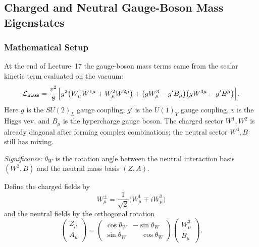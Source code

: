 \subsection{Charged and Neutral Gauge-Boson Mass Eigenstates}\label{subsec:lec18:gauge-mass-eigenstates}

\subsubsection*{Mathematical Setup}

At the end of Lecture~17 the gauge-boson mass terms came from the scalar
kinetic term evaluated on the vacuum:
\begin{equation}
  \mathcal{L}_{\rm mass}
  =\frac{v^2}{8}\Big[g^2\big(W^1_\mu W^{1\mu}+W^2_\mu W^{2\mu}\big)
  +\big(gW^3_\mu-g'B_\mu\big)\big(gW^{3\mu}-g'B^\mu\big)\Big] .
  \label{eq:lec18:starting-mass-terms}
\end{equation}
Here $g$ is the $SU(2)_L$ gauge coupling, $g'$ is the $U(1)_Y$ gauge coupling,
$v$ is the Higgs vev, and $B_\mu$ is the hypercharge gauge boson. The charged
sector $W^1,W^2$ is already diagonal after forming complex combinations; the
neutral sector $W^3,B$ still has mixing.


\textit{Significance:} $\theta_W$ is the rotation angle between the neutral interaction basis $(W^3,B)$ and the neutral mass basis $(Z,A)$.

Define the charged fields by
\begin{equation}
  \boxed{\;W^\pm_\mu=\frac{1}{\sqrt2}\big(W^1_\mu\mp iW^2_\mu\big)\;}
  \label{eq:lec18:wpm-definition}
\end{equation}
and the neutral fields by the orthogonal rotation
\begin{equation}
  \boxed{\;
  \begin{pmatrix} Z_\mu \\ A_\mu \end{pmatrix}
  =
  \begin{pmatrix}
    \cos\theta_W & -\sin\theta_W \\
    \sin\theta_W & \phantom{-}\cos\theta_W
  \end{pmatrix}
  \begin{pmatrix} W^3_\mu \\ B_\mu \end{pmatrix} .\;}
  \label{eq:lec18:neutral-rotation}
\end{equation}

